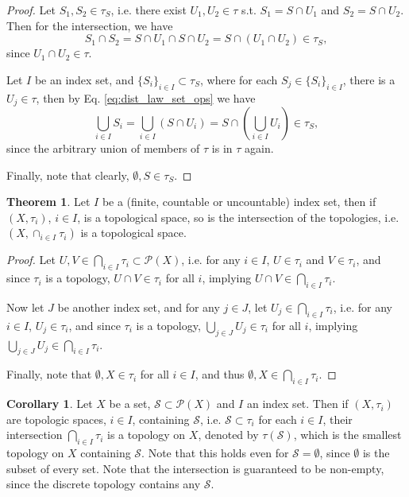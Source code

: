 \documentclass[12pt, a4paper]{article}
\numberwithin{equation}{section}
\theoremstyle{definition}
\theoremstyle{definition}
\newtheorem{theorem}[thm]{Theorem}
\newtheorem{corollary}[thm]{Corollary}
\begin{document}
		\begin{proof}
			Let $S_1, S_2\in \tau_S$, i.e. there exist $U_1, U_2\in \tau$ s.t. $S_1 = S\cap U_1$ and $S_2 = S\cap U_2$. Then for the intersection, we have 
			$$S_1 \cap S_2 = S\cap U_1\cap S\cap U_2 = S\cap (U_1\cap U_2) \in \tau_S, $$ since $U_1\cap U_2\in \tau$. 
			
			Let $I$ be an index set, and $\{S_i\}_{i\in I}\subset \tau_S$, where for each $S_j\in \{S_i\}_{i\in I}$, there is a $U_j\in \tau$, then by Eq. \eqref{eq:dist_law_set_ops} we have 
			$$\bigcup_{i\in I}S_i = \bigcup_{i\in I}\left(S\cap U_i\right) = S\cap \left(\bigcup_{i\in I}U_i\right)\in \tau_S,$$
			since the arbitrary union of members of $\tau$ is in $\tau$ again.
			
			Finally, note that clearly, $\emptyset, S\in \tau_S$.
		\end{proof}
	
		\begin{theorem}\label{thrm:arbitrary_intersec_tops_top}
			Let $I$ be a (finite, countable or uncountable) index set, then if $(X, \tau_i)$, $i\in I$, is a topological space, so is the intersection of the topologies, i.e. $\left(X, \cap_{i\in I}\tau_i\right)$ is a topological space.
		\end{theorem}
	
		\begin{proof}
			Let $U, V\in \bigcap_{i\in I}\tau_i \subset \mathcal P(X)$, i.e. for any $i\in I$, $U\in\tau_i$ and $V\in \tau_i$, and since $\tau_i$ is a topology, $U\cap V\in\tau_i$ for all $i$, implying $U\cap V\in\bigcap_{i\in I}\tau_i$.
			
			Now let $J$ be another index set, and for any $j\in J$, let $U_j\in \bigcap_{i\in I}\tau_i$, i.e. for any $i\in I$, $U_j\in \tau_i$, and since $\tau_i$ is a topology, $\bigcup_{j\in J}U_j\in \tau_i$ for all $i$, implying $\bigcup_{j\in J}U_j\in \bigcap_{i\in I}\tau_i$.
			
			Finally, note that $\emptyset, X\in \tau_i$ for all $i\in I$, and thus $\emptyset, X\in \bigcap_{i\in I}\tau_i$.
		\end{proof}
	
		\begin{corollary}\label{corollary:intersection_topology_containing_subset}
			Let $X$ be a set, $\mathscr S\subset \mathscr P(X)$ and $I$ an index set. Then if $(X, \tau_i)$ are topologic spaces, $i\in I$, containing $\mathscr S$, i.e. $\mathscr S\subset \tau_i$ for each $i\in I$, their intersection $\bigcap_{i\in I}\tau_i$ is a topology on $X$, denoted by $\tau(\mathscr S)$, which is the smallest topology on $X$ containing $\mathscr S$. Note that this holds even for $\mathscr S = \emptyset$, since $\emptyset$ is the subset of every set. Note that the intersection is guaranteed to be non-empty, since the discrete topology contains any $\mathscr S$. 
		\end{corollary}
	
\end{document}
